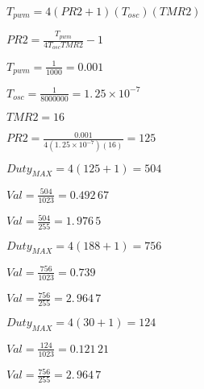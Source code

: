 \documentclass{article}
\begin{document}
\bigskip

$T_{pwm}=4\left( PR2+1\right) \left( T_{osc}\right) \left( TMR2\right) $

$PR2=\frac{T_{pwm}}{4T_{osc}TMR2}-1$

\bigskip

$T_{pwm}=\frac{1}{1000}=\allowbreak 0.001\,$

$T_{osc}=\frac{1}{8000000}=\allowbreak 1.\,\allowbreak 25\times 10^{-7}$

$TMR2=16$

$PR2=\frac{0.001}{4\left( \allowbreak \allowbreak 1.\,\allowbreak 25\times
10^{-7}\right) \left( 16\right) }=\allowbreak 125$

$Duty_{MAX}=4\left( 125+1\right) =\allowbreak 504$

$Val=\frac{504}{1023}=\allowbreak 0.492\,67$

$Val=\frac{504}{255}=\allowbreak 1.\,\allowbreak 976\,5$

\bigskip

$Duty_{MAX}=4\left( 188+1\right) =\allowbreak 756$

$Val=\frac{756}{1023}=\allowbreak 0.739\,$

$Val=\frac{756}{255}=\allowbreak 2.\,\allowbreak 964\,7$

\bigskip 

$Duty_{MAX}=4\left( 30+1\right) =\allowbreak 124$

$Val=\frac{124}{1023}=\allowbreak 0.121\,21$

$Val=\frac{756}{255}=\allowbreak 2.\,\allowbreak 964\,7$
\end{document}
